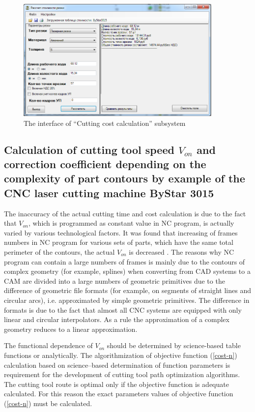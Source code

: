 \documentclass[runningheads]{llncs}
\begin{document}
\begin{figure}
  \begin{center}
  \includegraphics[width=0.9\textwidth]{app.png}
  \caption{The interface of ``Cutting cost calculation'' subsystem}
  \label{app-window}
  \end{center}
\end{figure}

\subsection{Calculation of cutting tool speed $V_{on}$
and correction coefficient depending on the complexity of
part contours by example of the CNC laser cutting machine ByStar 3015}

The inaccuracy of the actual cutting time and cost calculation is due to the fact that $V_{on}$,
which is programmed as constant value in NC program,
is actually varied by various technological factors.
It was found that increasing of frames numbers in NC program
for various sets of parts,
which have the same total perimeter of the contours,
the actual $V_{on}$ is decreased \cite{ru09,Tavaeva2015Nov}.
The reasons why NC program can contain a large numbers of frames
is mainly due to the contours of complex geometry (for example, splines)
when converting from CAD systems to a CAM
are divided into a large numbers of geometric primitives
due to the difference of geometric file formats
(for example, on segments of straight lines and circular arcs),
i.e. approximated by simple geometric primitives.
The difference in formats is due to the fact that
almost all CNC systems are equipped with only linear and circular interpolators.
As a rule the approximation of a complex geometry reduces to a linear approximation.

The functional dependence of $V_{on}$
should be determined by science-based table functions or analytically.
The algorithmization of objective function (\ref{cost-n})
calculation based on science–based determination of function parameters
is requirement for the development of cutting tool path optimization algorithms.
The cutting tool route is optimal only if
the objective function is adequate calculated.
For this reason the exact parameters values of objective function (\ref{cost-n})
must be calculated.
\end{document}

